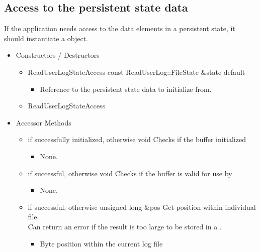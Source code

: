 \subsection{Access to the persistent state data}

If the application needs access to the data elements in a persistent
state, it should instantiate a  object.

\begin{itemize}
\item Constructors / Destructors

\begin{itemize}
\item \Constructor
  {ReadUserLogStateAccess}
  {const ReadUserLog::FileState \&state}
  {default}
  \begin{itemize}
  \item {}
    Reference to the persistent state data to initialize from.
  \end{itemize}

\item \Destructor
  {ReadUserLogStateAccess}
\end{itemize}

\item Accessor Methods
\begin{itemize}

\item {}
  {} { if successfully initialized,  otherwise}
  {void}
  {Checks if the buffer initialized}
  \begin{itemize} \item None. \end{itemize}

\item {}
  {} { if successful,  otherwise}
  {void}
  {Checks if the buffer is valid for use by 
  }
  \begin{itemize} \item None. \end{itemize}

\item {}
  {} { if successful,  otherwise}
  {unsigned long \&pos}
  {Get position within individual file.
    \\ \Note Can return an error if the result is too large to be
    stored in a .}
  \begin{itemize}
  \item {}
    Byte position within the current log file
  \end{itemize}


\end{itemize}
\end{itemize}
